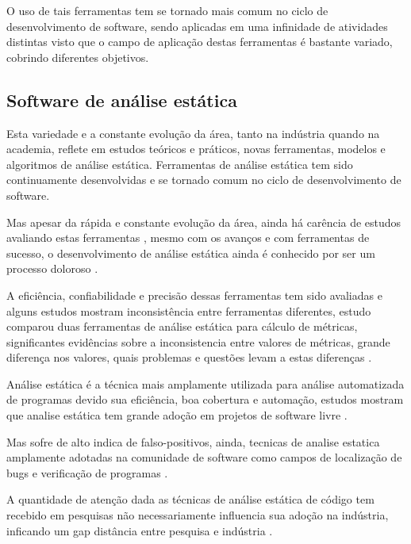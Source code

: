 O uso de tais ferramentas tem se
tornado mais comum no ciclo de desenvolvimento de
software, sendo aplicadas em uma infinidade de atividades distintas visto que o
campo de aplicação destas ferramentas é bastante variado, cobrindo diferentes
objetivos.

\subsection{Software de análise estática}

Esta variedade e a constante evolução da área, tanto na indústria quando na
academia, reflete em estudos teóricos e práticos, novas ferramentas, modelos e
algoritmos de análise estática. Ferramentas de análise estática tem sido
continuamente desenvolvidas e se tornado comum no ciclo de desenvolvimento de
software.


Mas apesar da rápida e constante evolução da área, ainda há carência de estudos
avaliando estas ferramentas \cite{Li2010}, mesmo com os avanços e com
ferramentas de sucesso, o desenvolvimento de análise estática ainda é conhecido
por ser um processo doloroso \cite{toman2017taming}.

A eficiência, confiabilidade e precisão dessas ferramentas tem sido avaliadas e
alguns estudos mostram inconsistência entre ferramentas diferentes, estudo
comparou duas ferramentas de análise estática para cálculo de métricas,
significantes evidências sobre a inconsistencia entre valores de métricas,
grande diferença nos valores, quais problemas e questões levam a estas
diferenças \cite{Alemerien2013}.

Análise estática é a técnica mais amplamente utilizada para análise
automatizada de programas devido sua eficiência, boa cobertura e automação,
estudos mostram que analise estática tem grande adoção em projetos de software
livre \cite{beller2016analyzing}.

Mas sofre de alto indica de falso-positivos, ainda, tecnicas de analise
estatica amplamente adotadas na comunidade de software como campos de
localização de bugs e verificação de programas \cite{Gosain2015}.

A quantidade de atenção dada as técnicas de análise estática de código tem
recebido em pesquisas não necessariamente influencia sua adoção na indústria,
inficando um gap distância entre pesquisa e indústria \cite{ilyas2016static}.

